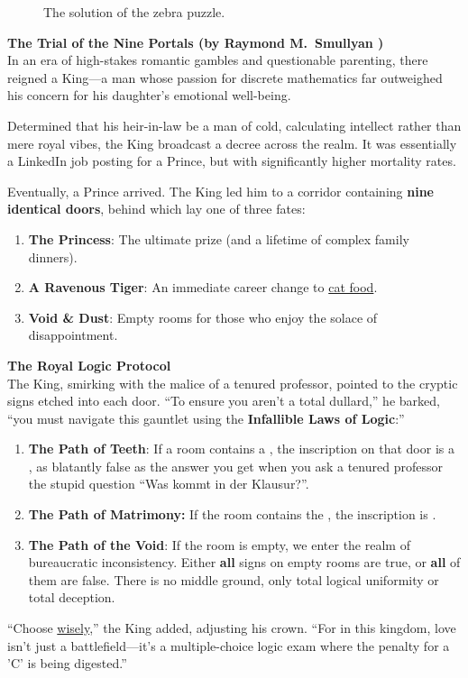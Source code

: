 \begin{figure}[!ht]
  \centering
  \caption{The solution of the zebra puzzle.}
  \label{fig:zebra}
\end{figure}

\pagebreak
\vspace*{\fill}

\pagebreak

\exerciseEng
\textbf{\large The Trial of the Nine Portals (by Raymond M.~Smullyan \cite{smullyan:1982})} \\
In an era of high-stakes romantic gambles and questionable parenting, there reigned a King—a man whose passion
for discrete mathematics far outweighed his concern for his daughter’s emotional well-being.  

Determined that his heir-in-law be a man of cold, calculating intellect rather than mere royal vibes, the
King broadcast a decree across the realm. It was essentially a LinkedIn job posting for a Prince, but with
significantly higher mortality rates. 

Eventually, a Prince arrived. The King led him to a corridor containing \textbf{nine identical doors}, behind
which lay one of three fates: 
\begin{enumerate}
\item \textbf{The Princess}:     The ultimate prize (and a lifetime of complex family dinners).
\item \textbf{A Ravenous Tiger}: An immediate career change to \href{https://www.whiskas.de/}{cat food}.
\item \textbf{Void \& Dust}:     Empty rooms for those who enjoy the solace of disappointment.
\end{enumerate}

\noindent
\textbf{\large The Royal Logic Protocol} \\
The King, smirking with the malice of a tenured professor, pointed to the cryptic signs etched into each
door. ``To ensure you aren't a total dullard,'' he barked, ``you must navigate this gauntlet using the
\textbf{Infallible Laws of Logic}:'' 
\begin{enumerate}
\item \textbf{The Path of Teeth}: If a room contains a , the inscription on that door is a
      , as blatantly false as the answer you get when you ask a tenured professor the stupid
      question ``Was kommt in der Klausur?''.
\item \textbf{The Path of Matrimony:} If the room contains the , the inscription is
      .
\item \textbf{The Path of the Void}: If the room is empty, we enter the realm of bureaucratic inconsistency.
      Either \textbf{all} signs on empty rooms are true, or \textbf{all} of them are false. There is no middle
      ground, only total logical uniformity or total deception. 
\end{enumerate}
``Choose \href{https://www.youtube.com/watch?v=c3RN9zz77Cs}{wisely},'' the King added, adjusting his crown.
``For in this kingdom, love isn't just a battlefield—it's a multiple-choice logic exam where the penalty for a 'C'
is being digested.''  

